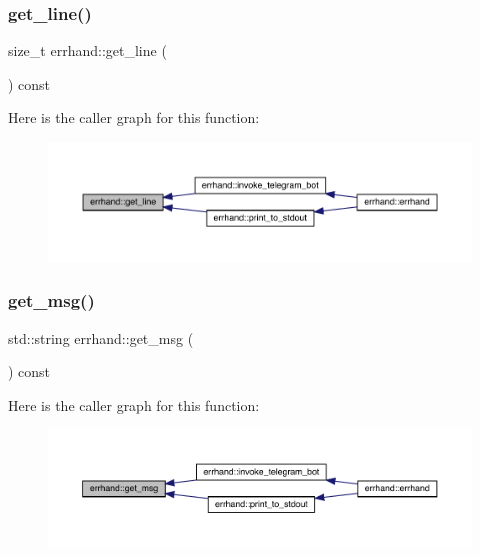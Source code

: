 \subsubsection{\texorpdfstring{get\+\_\+line()}{get\_line()}}
{\footnotesize\ttfamily size\+\_\+t errhand\+::get\+\_\+line (\begin{DoxyParamCaption}{ }\end{DoxyParamCaption}) const\hspace{0.3cm}{\ttfamily [inline]}}

Here is the caller graph for this function\+:\nopagebreak
\begin{figure}[H]
\begin{center}
\leavevmode
\includegraphics[width=350pt]{classerrhand_a258f97d84476b21efc38827cda3e5889_icgraph}
\end{center}
\end{figure}
\mbox{\label{classerrhand_a524dfc6821f703329d8801dd3298f33f}} 
\subsubsection{\texorpdfstring{get\+\_\+msg()}{get\_msg()}}
{\footnotesize\ttfamily std\+::string errhand\+::get\+\_\+msg (\begin{DoxyParamCaption}{ }\end{DoxyParamCaption}) const\hspace{0.3cm}{\ttfamily [inline]}}

Here is the caller graph for this function\+:\nopagebreak
\begin{figure}[H]
\begin{center}
\leavevmode
\includegraphics[width=350pt]{classerrhand_a524dfc6821f703329d8801dd3298f33f_icgraph}
\end{center}
\end{figure}
\mbox{\label{classerrhand_adbc86e81b391a68d2bf9a13529c977d3}} 
